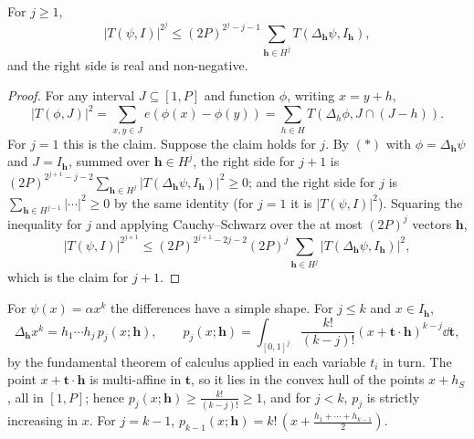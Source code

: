\begin{lemma}\label{lem:weyldiff}
For $j\ge1$,
\[
|T(\psi,I)|^{2^j}\le(2P)^{2^j-j-1}\sum_{\mathbf h\in H^j}T(\Delta_{\mathbf h}\psi,I_{\mathbf h}),
\]
and the right side is real and non-negative.
\end{lemma}
\begin{proof}
For any interval $J\subseteq[1,P]$ and function $\phi$, writing $x=y+h$,
\[
|T(\phi,J)|^2=\sum_{x,y\in J}e(\phi(x)-\phi(y))=\sum_{h\in H}T(\Delta_h\phi,J\cap(J-h)).\tag{$\ast$}
\]
For $j=1$ this is the claim. Suppose the claim holds for $j$. By $(\ast)$ with $\phi=\Delta_{\mathbf h}\psi$ and $J=I_{\mathbf h}$, summed over $\mathbf h\in H^j$, the right side for $j+1$ is $(2P)^{2^{j+1}-j-2}\sum_{\mathbf h\in H^j}|T(\Delta_{\mathbf h}\psi,I_{\mathbf h})|^2\ge0$; and the right side for $j$ is $\sum_{\mathbf h\in H^{j-1}}|\cdots|^2\ge0$ by the same identity (for $j=1$ it is $|T(\psi,I)|^2$). Squaring the inequality for $j$ and applying Cauchy--Schwarz over the at most $(2P)^j$ vectors $\mathbf h$,
\[
|T(\psi,I)|^{2^{j+1}}\le(2P)^{2^{j+1}-2j-2}(2P)^j\sum_{\mathbf h\in H^j}|T(\Delta_{\mathbf h}\psi,I_{\mathbf h})|^2,
\]
which is the claim for $j+1$.
\end{proof}

For $\psi(x)=\alpha x^k$ the differences have a simple shape. For $j\le k$ and $x\in I_{\mathbf h}$,
\[
\Delta_{\mathbf h}x^k=h_1\cdots h_j\,p_j(x;\mathbf h),\qquad p_j(x;\mathbf h)=\int_{[0,1]^j}\frac{k!}{(k-j)!}(x+\mathbf t\cdot\mathbf h)^{k-j}\dd\mathbf t,\tag{$\dagger$}
\]
by the fundamental theorem of calculus applied in each variable $t_i$ in turn. The point $x+\mathbf t\cdot\mathbf h$ is multi-affine in $\mathbf t$, so it lies in the convex hull of the points $x+h_S$, all in $[1,P]$; hence $p_j(x;\mathbf h)\ge\frac{k!}{(k-j)!}\ge1$, and for $j<k$, $p_j$ is strictly increasing in $x$. For $j=k-1$, $p_{k-1}(x;\mathbf h)=k!\,(x+\frac{h_1+\cdots+h_{k-1}}2)$.

